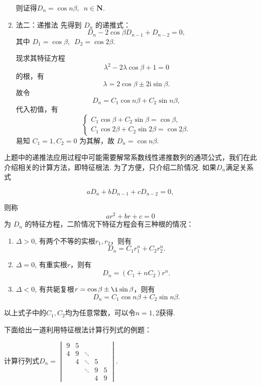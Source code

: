 \begin{solution}
\begin{enumerate}
            则证得$D_n=\cos n\beta,\enspace n\in \mathbf{N}$.

        \item 法二：递推法
            先得到 $D_n$ 的递推式：
            \[
                D_n - 2 \cos \beta D_{n-1} + D_{n-2} = 0,
            \]
            其中 $D_1 = \cos \beta, \enspace D_2 = \cos 2\beta$.

            现求其特征方程
            \[
                \lambda^2 - 2 \lambda \cos \beta + 1 = 0
            \]
            的根，有
            \[
                \lambda = 2 \cos \beta \pm 2 \mathrm{i} \sin \beta.
            \]
            故令
            \[
                D_n = C_1 \cos n\beta + C_2 \sin n\beta,
            \]
            代入初值，有
            \[
                \begin{cases}
                    C_1 \cos \beta + C_2 \sin \beta = \cos \beta, \\
                    C_1 \cos 2\beta + C_2 \sin 2\beta = \cos 2\beta.
                \end{cases}
            \]
            易知 $C_1 = 1, C_2 = 0$ 为其解，故 $D_n = \cos n\beta$.
    \end{enumerate}
\end{solution}

上题中的递推法应用过程中可能需要解常系数线性递推数列的通项公式，我们在此介绍相关的计算方法，即特征根法. 为了方便，只介绍二阶情况. 如果$D_n$满足关系式

\[ aD_n+bD_{n-1}+cD_{n-2}=0, \]

则称
\[ ar^2+br+c=0 \]
为 $D_n$ 的特征方程，二阶情况下特征方程会有三种根的情况：
\begin{enumerate}
    \item $\Delta>0$, 有两个不等的实根$r_1, r_2$，则有
          \[ D_n=C_1r_1^n+C_2r_2^n. \]

    \item $\Delta=0$, 有重实根$r$，则有
          \[ D_n=(C_1+nC_2)r^n. \]

    \item $\Delta<0$, 有共轭复根$r=\cos\beta\pm \i\sin\beta$，则有
          \[ D_n=C_1\cos n\beta + C_2\sin n\beta. \]
\end{enumerate}
以上式子中的$C_1,C_2$均为任意常数，可以令$n=1,2$获得.

下面给出一道利用特征根法计算行列式的例题：

\begin{example}{}{}
    计算行列式$D_n=
        \begin{vmatrix}
            9 & 5 &        &   &   \\
            4 & 9 & \ddots &   &   \\
              & 4 & \ddots & 5 &   \\
              &   & \ddots & 9 & 5 \\
              &   &        & 4 & 9
        \end{vmatrix}$.
\end{example}

